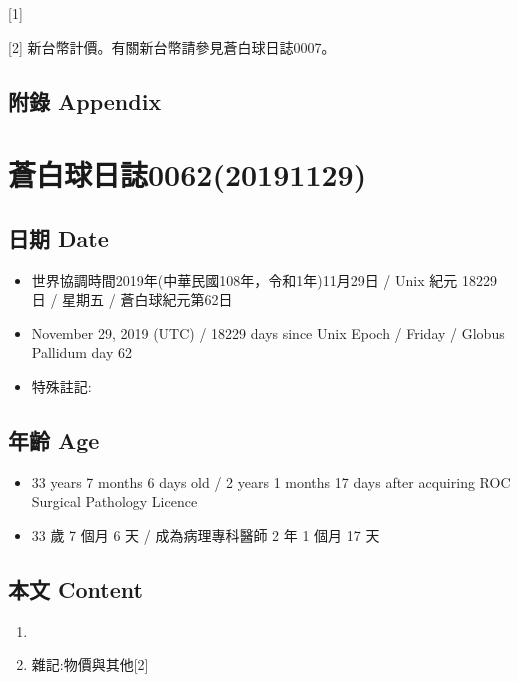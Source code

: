 \documentclass[a5paper, 12pt
]{book}
\providecommand{\tightlist}{%
  \setlength{\itemsep}{0pt}\setlength{\parskip}{0pt}}
\begin{document}
{[}1{]}

{[}2{]} 新台幣計價。有關新台幣請參見蒼白球日誌0007。

\hypertarget{ux9644ux9304-appendix-53}{%
\subsection{附錄 Appendix}\label{ux9644ux9304-appendix-53}}

\hypertarget{ux84bcux767dux7403ux65e5ux8a8c006220191129}{%
\section{蒼白球日誌0062(20191129)}\label{ux84bcux767dux7403ux65e5ux8a8c006220191129}}

\hypertarget{ux65e5ux671f-date-61}{%
\subsection{日期 Date}\label{ux65e5ux671f-date-61}}

\begin{itemize}
\tightlist
\item
  世界協調時間2019年(中華民國108年，令和1年)11月29日 / Unix 紀元 18229
  日 / 星期五 / 蒼白球紀元第62日
\item
  November 29, 2019 (UTC) / 18229 days since Unix Epoch / Friday /
  Globus Pallidum day 62
\item
  特殊註記:
\end{itemize}

\hypertarget{ux5e74ux9f61-age-61}{%
\subsection{年齡 Age}\label{ux5e74ux9f61-age-61}}

\begin{itemize}
\tightlist
\item
  33 years 7 months 6 days old / 2 years 1 months 17 days after
  acquiring ROC Surgical Pathology Licence
\item
  33 歲 7 個月 6 天 / 成為病理專科醫師 2 年 1 個月 17 天
\end{itemize}

\hypertarget{ux672cux6587-content-61}{%
\subsection{本文 Content}\label{ux672cux6587-content-61}}

\begin{enumerate}
\def\labelenumi{\arabic{enumi}.}
\item
\item
  雜記:物價與其他{[}2{]}
\end{enumerate}
\end{document}
